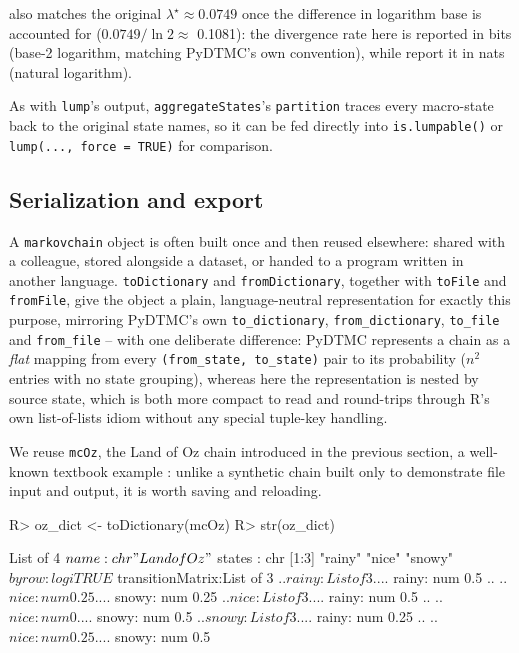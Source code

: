 \documentclass[
  nojss]{jss}
\begin{document}
also matches the original \(\lambda^\star \approx 0.0749\) once the difference
in logarithm base is accounted for (\(0.0749/\ln 2 \approx\)
0.1081): the divergence rate here is reported in bits
(base-2 logarithm, matching PyDTMC's own convention), while
\citet{deng2009simulation} report it in nats (natural logarithm).

As with \texttt{lump}'s output, \texttt{aggregateStates}'s \texttt{partition} traces every
macro-state back to the original state names, so it can be fed directly into
\texttt{is.lumpable()} or \texttt{lump(...,\ force\ =\ TRUE)} for comparison.

\subsection{Serialization and export}\label{sec:serialization}

A \texttt{markovchain} object is often built once and then reused elsewhere: shared
with a colleague, stored alongside a dataset, or handed to a program written
in another language. \texttt{toDictionary} and \texttt{fromDictionary}, together with
\texttt{toFile} and \texttt{fromFile}, give the object a plain, language-neutral representation for exactly this
purpose, mirroring PyDTMC's own \texttt{to\_dictionary}, \texttt{from\_dictionary},
\texttt{to\_file} and \texttt{from\_file} -- with one deliberate difference: PyDTMC represents a
chain as a \emph{flat} mapping from every \texttt{(from\_state,\ to\_state)} pair to its
probability (\(n^2\) entries with no state grouping), whereas here the
representation is nested by source state, which is both more compact to
read and round-trips through R's own list-of-lists idiom without any
special tuple-key handling.

We reuse \texttt{mcOz}, the Land of Oz chain introduced in the previous section,
a well-known textbook example \citep{landOfOz}: unlike a synthetic chain
built only to demonstrate file input and output, it is worth saving and reloading.

\begin{CodeChunk}
\begin{CodeInput}
R> oz_dict <- toDictionary(mcOz)
R> str(oz_dict)
\end{CodeInput}
\begin{CodeOutput}
List of 4
 $ name            : chr "Land of Oz"
 $ states          : chr [1:3] "rainy" "nice" "snowy"
 $ byrow           : logi TRUE
 $ transitionMatrix:List of 3
  ..$ rainy:List of 3
  .. ..$ rainy: num 0.5
  .. ..$ nice : num 0.25
  .. ..$ snowy: num 0.25
  ..$ nice :List of 3
  .. ..$ rainy: num 0.5
  .. ..$ nice : num 0
  .. ..$ snowy: num 0.5
  ..$ snowy:List of 3
  .. ..$ rainy: num 0.25
  .. ..$ nice : num 0.25
  .. ..$ snowy: num 0.5
\end{CodeOutput}
\end{CodeChunk}
\end{document}
